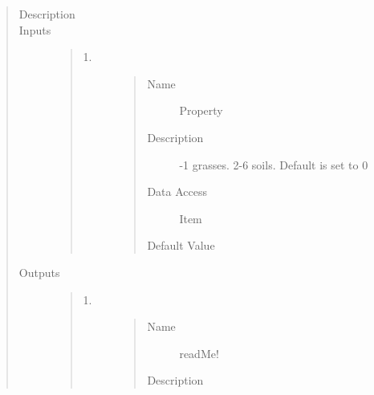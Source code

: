 \documentclass[letterpaper,10pt,english]{sphinxmanual}
\begin{document}
\begin{quote}\begin{description}
\item[{Description}] \leavevmode
{}

\item[{Inputs}] \leavevmode\begin{quote}\begin{description}
\item[{1.}] \leavevmode\begin{quote}\begin{description}
\item[{Name}] \leavevmode
Property

\item[{Description}] -1 grasses. 2-6 soils. Default is set to 0

\item[{Data Access}] \leavevmode
Item

\item[{Default Value}] \leavevmode
{}

\end{description}\end{quote}

\end{description}\end{quote}

\item[{Outputs}] \leavevmode\begin{quote}\begin{description}
\item[{1.}] \leavevmode\begin{quote}\begin{description}
\item[{Name}] \leavevmode
readMe!

\item[{Description}] \leavevmode
{}


\end{description}
\end{quote}
\end{description}
\end{quote}
\end{description}
\end{quote}
\end{document}
